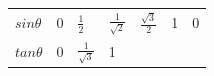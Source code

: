 {\begin{center}
\begin{xtabular*}{\mytablewidth}[t]{|p{10\mystarwidth}|p{10\mystarwidth}|p{10\mystarwidth}|p{10\mystarwidth}|p{10\mystarwidth}|p{10\mystarwidth}|p{10\mystarwidth}|}
                $sin\theta $
               &
        0 &
                $\frac{1}{2}$
               &
                $\frac{1}{\sqrt{2}}$
               &
                $\frac{\sqrt{3}}{2}$
               &
        1 &
        0%
     \tabularnewline{}
                $tan\theta $
               &
        0 &
                $\frac{1}{\sqrt{3}}$
               &
        1 &

\end{xtabular*}
\end{center}}

